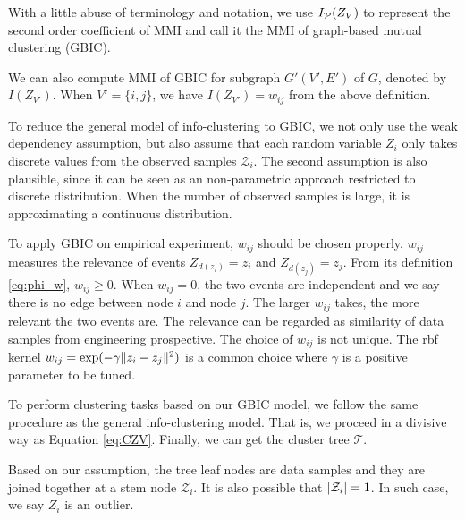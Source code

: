 With a little abuse of terminology and notation, we use $I_{\P}(Z_V)$ to represent the second order coefficient of MMI and call it the MMI of graph-based mutual clustering (GBIC). 


We can also compute MMI of GBIC for subgraph $G'(V',E')$ of $G$, denoted by $I(Z_{V'})$. When $V'=\{i,j\}$, we have $I(Z_{V'})=w_{ij}$ from the above definition.

To reduce the general model of info-clustering to GBIC, we not only use the weak dependency assumption, but also assume that each random variable $Z_i$ only takes discrete values from the observed samples $\mathcal{Z}_i$. The second assumption is also plausible, since it can be seen as an non-parametric approach restricted to discrete distribution. When the number of observed samples is large, it is approximating a continuous distribution.

To apply GBIC on empirical experiment, $w_{ij}$ should be chosen properly. $w_{ij}$ measures the relevance of events $Z_{d(z_i)} = z_i$
and $Z_{d(z_j)} = z_j$. 
From its definition \eqref{eq:phi_w}, $w_{ij} \geq 0$. When $w_{ij} = 0$, the two events are independent and we say there is no edge between
node $i$ and node $j$. The larger $w_{ij}$ takes, the more relevant the two events are. The relevance can be regarded as similarity of data samples 
from engineering prospective. The choice of $w_{ij}$ is not unique. The rbf kernel $w_{ij} = \exp(-\gamma \norm{z_i - z_j}^2)$ is a common choice
where $\gamma$ is a positive parameter to be tuned.

To perform clustering tasks based on our GBIC model, we follow the same procedure as the general info-clustering model. That is, we proceed in a divisive way as Equation \eqref{eq:CZV}. Finally, we can get the cluster tree $\mathcal{T}$.

Based on our assumption, the tree leaf nodes are data samples and they are joined together at a stem node $\mathcal{Z}_i$. It is also possible that $\abs{\mathcal{Z}_i} = 1$. In such case, we say $Z_i$ is an outlier.


